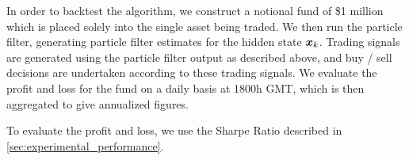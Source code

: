 \documentclass[../main.tex]{subfiles}
\begin{document}
In order to backtest the algorithm, we construct a notional fund of \$1 million which is placed solely into the single asset being traded. We then run the particle filter, generating particle filter estimates for the hidden state $\bm{x}_k$. Trading signals are generated using the particle filter output as described above, and buy / sell decisions are undertaken according to these trading signals. We evaluate the profit and loss for the fund on a daily basis at 1800h GMT, which is then aggregated to give annualized figures. 

To evaluate the profit and loss, we use the Sharpe Ratio described in \autoref{sec:experimental_performance}. 	
	
\end{document}
